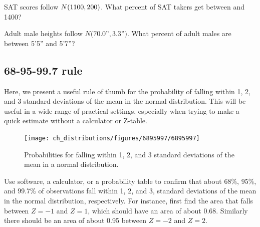 \begin{exercisewrap}
\begin{nexercise}
SAT scores follow $N(1100{}, 200{})$.
What percent of SAT takers get between \satmean{} and
1400?\footnotemark
\end{nexercise}
\end{exercisewrap}

\begin{exercisewrap}
\begin{nexercise}
Adult male heights follow $N(70.0$''$, 3.3$''$)$.
What percent of adult males are between 5'5''
and 5'7''?\footnotemark{}
\end{nexercise}
\end{exercisewrap}


\subsection{68-95-99.7 rule}

Here, we present a useful rule of thumb for the probability of falling within 1, 2, and 3 standard deviations of the mean in the normal distribution. This will be useful in a wide range of practical settings, especially when trying to make a quick estimate without a calculator or Z-table.

\begin{figure}[hht]
\centering
\texttt{[image: ch\_distributions/figures/6895997/6895997]}
\caption{Probabilities for falling within 1, 2, and 3 standard deviations of the mean in a normal distribution.}
\label{6895997}
\end{figure}

\begin{exercisewrap}
\begin{nexercise}
Use software, a calculator, or a probability table
to confirm that about 68\%, 95\%, and 99.7\%
of observations fall within 1, 2, and 3, standard deviations
of the mean in the normal distribution, respectively.
For instance, first find the area that falls between $Z=-1$
and $Z=1$, which should have an area of about 0.68.
Similarly there should be an area of about 0.95 between
$Z=-2$ and $Z=2$.\footnotemark{}
\end{nexercise}
\end{exercisewrap}


